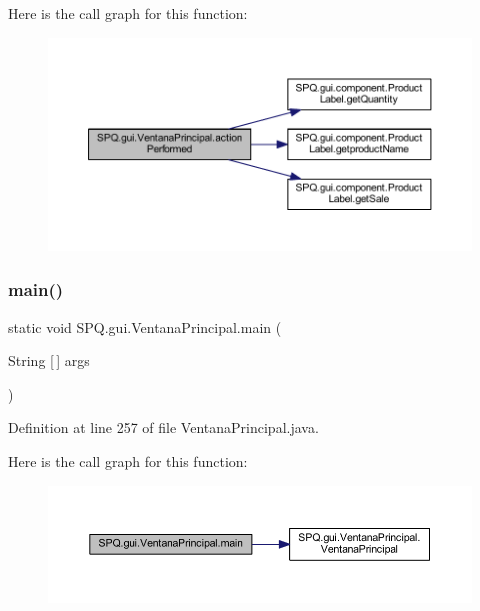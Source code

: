 Here is the call graph for this function\+:
\nopagebreak
\begin{figure}[H]
\begin{center}
\leavevmode
\includegraphics[width=350pt]{class_s_p_q_1_1gui_1_1_ventana_principal_a8cb181f9dff7128cd674383688ca2c56_cgraph}
\end{center}
\end{figure}
\mbox{\label{class_s_p_q_1_1gui_1_1_ventana_principal_a48fb869f7efb018079dac708ed20f7d3}} 
\subsubsection{\texorpdfstring{main()}{main()}}
{\footnotesize\ttfamily static void S\+P\+Q.\+gui.\+Ventana\+Principal.\+main (\begin{DoxyParamCaption}\item[{String \mbox{[}$\,$\mbox{]}}]{args }\end{DoxyParamCaption})\hspace{0.3cm}{\ttfamily [static]}}



Definition at line 257 of file Ventana\+Principal.\+java.

Here is the call graph for this function\+:
\nopagebreak
\begin{figure}[H]
\begin{center}
\leavevmode
\includegraphics[width=350pt]{class_s_p_q_1_1gui_1_1_ventana_principal_a48fb869f7efb018079dac708ed20f7d3_cgraph}
\end{center}
\end{figure}


